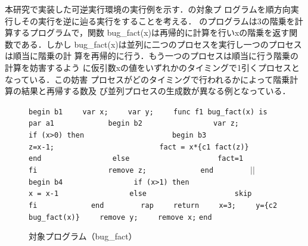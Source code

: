 \documentclass[submit,PRO]{ipsj}
\def\|{\verb|}
\begin{document}
本研究で実装した可逆実行環境の実行例を示す．の対象プ
ログラムを順方向実行しその実行を逆に辿る実行をすることを考える．
のプログラムは3の階乗を計算するプログラムで，関数
bug\_fact(x)は再帰的に計算を行いxの階乗を返す関数である．しかし
bug\_fact(x)は並列に二つのプロセスを実行し一つのプロセスは順当に階乗の計
算を再帰的に行う．もう一つのプロセスは順当に行う階乗の計算を妨害するよう
に仮引数xの値をいずれかのタイミングで1引くプロセスとなっている．この妨害
プロセスがどのタイミングで行われるかによって階乗計算の結果と再帰する数及
び並列プロセスの生成数が異なる例となっている．

\begin{figure}[tb]
\vbox{
\hbox{\|begin b1|}
\hbox{\|    var x;|}
\hbox{\|    var y;|}
\hbox{\|    func f1 bug_fact(x) is|}
\hbox{\|        par a1|}
\hbox{\|            begin b2|}
\hbox{\|                var z;|}
\hbox{\|                if (x>0) then|}
\hbox{\|                    begin b3|}
\hbox{\|                        z=x-1;|}
\hbox{\|                        fact = x*{c1 fact(z)}|}
\hbox{\|                    end|}
\hbox{\|                else|}
\hbox{\|                    fact=1|}
\hbox{\|                fi|}
\hbox{\|                remove z;|}
\hbox{\|            end|}
\hbox{\|        |$||$\|  begin b4|}
\hbox{\|                if (x>1) then|}
\hbox{\|                    x = x-1|}
\hbox{\|                else|}
\hbox{\|                    skip|}
\hbox{\|                fi|}
\hbox{\|            end|}
\hbox{\|        rap|}
\hbox{\|    return|}
\hbox{\|    x=3;|}
\hbox{\|    y={c2 bug_fact(x)}|}
\hbox{\|    remove y;|}
\hbox{\|    remove x;|}
\hbox{\|end|}
}
\centerline{}
\caption{対象プログラム（bug\_fact）}
\label{fig:target}
\end{figure}
\end{document}
